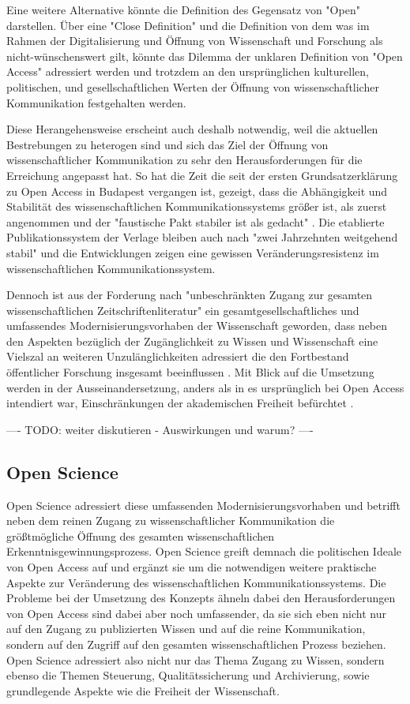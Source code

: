 Eine weitere Alternative könnte die Definition des Gegensatz von "Open" darstellen. Über eine "Close Definition" und die Definition von dem was im Rahmen der Digitalisierung und Öffnung von Wissenschaft und Forschung als nicht-wünschenswert gilt, könnte das Dilemma der unklaren Definition von "Open Access" adressiert werden und trotzdem an den ursprünglichen kulturellen, politischen, und gesellschaftlichen Werten der Öffnung von wissenschaftlicher Kommunikation festgehalten werden.

Diese Herangehensweise erscheint auch deshalb notwendig, weil die aktuellen Bestrebungen zu heterogen sind und sich das Ziel der Öffnung von wissenschaftlicher Kommunikation zu sehr den Herausforderungen für die Erreichung angepasst hat. So hat die Zeit die seit der ersten Grundsatzerklärung zu Open Access in Budapest vergangen ist, gezeigt, dass die Abhängigkeit und Stabilität des wissenschaftlichen Kommunikationssystems größer ist, als zuerst angenommen und der "faustische Pakt stabiler ist als gedacht" \cite{hagner_2015_sache_buches}. Die etablierte Publikationssystem der Verlage bleiben auch nach "zwei Jahrzehnten weitgehend stabil" \cite{Hanekop_2014} und die Entwicklungen zeigen eine gewissen Veränderungsresistenz im wissenschaftlichen Kommunikationssystem.

Dennoch ist aus der Forderung nach "unbeschränkten Zugang zur gesamten wissenschaftlichen Zeitschriftenliteratur" \cite{boai_2012} ein gesamtgesellschaftliches und umfassendes Modernisierungsvorhaben der Wissenschaft geworden, dass neben den Aspekten bezüglich der Zugänglichkeit zu Wissen und Wissenschaft eine Vielszal an weiteren Unzulänglichkeiten adressiert die den Fortbestand öffentlicher Forschung insgesamt beeinflussen \cite{brembs2015open}. Mit Blick auf die Umsetzung werden in der Ausseinandersetzung, anders als in es ursprünglich bei Open Access intendiert war, Einschränkungen der akademischen Freiheit befürchtet \cite{hagner_2015_sache_buches}.

---- TODO: weiter diskutieren - Auswirkungen und warum? ----

\subsection{Open Science}

Open Science adressiert diese umfassenden Modernisierungsvorhaben und betrifft neben dem reinen Zugang zu wissenschaftlicher Kommunikation die größtmögliche Öffnung des gesamten wissenschaftlichen Erkenntnisgewinnungsprozess. Open Science greift demnach die politischen Ideale von Open Access auf und ergänzt sie um die notwendigen weitere praktische Aspekte zur Veränderung des wissenschaftlichen Kommunikationssystems. Die Probleme bei der Umsetzung des Konzepts ähneln dabei den Herausforderungen von Open Access sind dabei aber noch umfassender, da sie sich eben nicht nur auf den Zugang zu publizierten Wissen und auf die reine Kommunikation, sondern auf den Zugriff auf den gesamten wissenschaftlichen Prozess beziehen. Open Science adressiert also nicht nur das Thema Zugang zu Wissen, sondern ebenso die Themen Steuerung, Qualitätssicherung und Archivierung, sowie grundlegende Aspekte wie die Freiheit der Wissenschaft.

